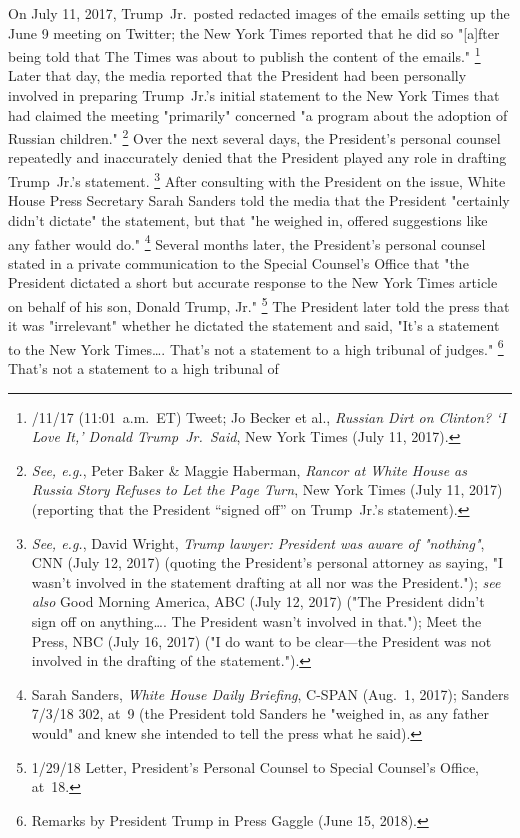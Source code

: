 {On July 11, 2017, Trump~Jr.\ posted redacted images of the emails setting up the June 9 meeting on Twitter; the New York Times reported that he did so "[a]fter being told that The Times was about to publish the content of the emails."%
\footnote{/11/17 (11:01~a.m.~ET) Tweet;
Jo Becker et al., \textit{Russian Dirt on Clinton? `I Love It,' Donald Trump~Jr.\ Said}, New York Times (July 11, 2017).}
Later that day, the media reported that the President had been personally involved in preparing Trump~Jr.'s initial statement to the New York Times that had claimed the meeting "primarily" concerned "a program about the adoption of Russian children."%
\footnote{\textit{See, e.g.}, Peter Baker \& Maggie Haberman, \textit{Rancor at White House as Russia Story Refuses to Let the Page Turn}, New York Times (July 11, 2017) (reporting that the President ``signed off'' on Trump~Jr.'s statement).}
Over the next several days, the President's personal counsel repeatedly and inaccurately denied that the President played any role in drafting Trump~Jr.'s statement.%
\footnote{\textit{See, e.g.}, David Wright, \textit{Trump lawyer: President was aware of "nothing"}, CNN (July 12, 2017) (quoting the President's personal attorney as saying, "I wasn't involved in the statement drafting at all nor was the President.");
\textit{see also} Good Morning America, ABC (July 12, 2017) ("The President didn't sign off on anything\dots. The President wasn't involved in that.");
Meet the Press, NBC (July 16, 2017) ("I do want to be clear---the President was not involved in the drafting of the statement.").}
After consulting with the President on the issue, White House Press Secretary Sarah Sanders told the media that the President "certainly didn't dictate" the statement, but that "he weighed in, offered suggestions like any father would do."%
\footnote{Sarah Sanders, \textit{White House Daily Briefing}, C-SPAN (Aug.~1, 2017);
Sanders 7/3/18 302, at~9 (the President told Sanders he "weighed in, as any father would" and knew she intended to tell the press what he said).}
Several months later, the President's personal counsel stated in a private communication to the Special Counsel's Office that "the President dictated a short but accurate response to the New York Times article on behalf of his son, Donald Trump, Jr."%
\footnote{1/29/18 Letter, President's Personal Counsel to Special Counsel's Office, at~18.}
The President later told the press that it was "irrelevant" whether he dictated the statement and said, "It's a statement to the New York Times\dots. That's not a statement to a high tribunal of judges."%
\footnote{Remarks by President Trump in Press Gaggle (June 15, 2018).}
That's not a statement to a high tribunal of

}
